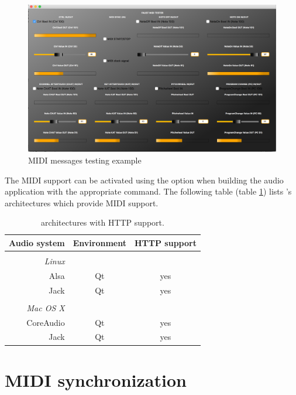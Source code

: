 \begin{figure}[h!]
  \centering
  \includegraphics[width=\textwidth]{images/midi-tester.png}
  \caption{MIDI messages testing example}   
  \label{fig:midi-tester}
\end{figure}

The MIDI support can be activated using the  option when building the audio application with the appropriate  command. The following table (table \ref{tab:midiarch}) lists \faust's architectures which provide MIDI support. 

\begin{table}[htp]
\begin{center}
\begin{tabular}{rcc}
\hline
\bf{Audio system} 	& \bf{Environment} & \bf{HTTP support}	\\
\hline
\\
\emph{Linux}\\
Alsa  		& Qt		& yes\\
Jack 			& Qt		& yes\\
\\
\emph{Mac OS X} \\
CoreAudio 	& Qt 	 & yes\\
Jack 			& Qt  & yes\\
\hline
\end{tabular}
\end{center}
\caption{\faust architectures with HTTP support.}
\label{tab:midiarch}
\end{table}

\section{MIDI synchronization}

